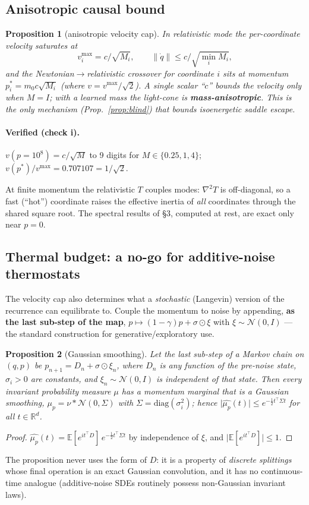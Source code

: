 \documentclass[11pt]{article}
\theoremstyle{plain}
\newtheorem{proposition}{Proposition}
\theoremstyle{definition}
\begin{document}
\subsection{Anisotropic causal bound}
\begin{proposition}[anisotropic velocity cap]\label{prop:cap}
In relativistic mode the per-coordinate velocity saturates at
\[ v_i^{\max}=c/\sqrt{M_i},\qquad \lVert\dot q\rVert\le c/\sqrt{\min_iM_i}, \]
and the Newtonian$\to$relativistic crossover for coordinate $i$ sits at momentum $p_i^*=m_0c\sqrt{M_i}$ (where $v=v^{\max}/\sqrt2$). A single scalar ``$c$'' bounds the velocity only when $M=I$; with a learned mass the light-cone is \textbf{mass-anisotropic}. This is the only mechanism (Prop.~\ref{prop:blind}) that bounds isoenergetic saddle escape.
\end{proposition}
\paragraph{Verified (check i).} $v(p=10^8)=c/\sqrt M$ to 9 digits for $M\in\{0.25,1,4\}$; $v(p^*)/v^{\max}=0.707107=1/\sqrt2$.

At finite momentum the relativistic $T$ couples modes: $\nabla^2T$ is off-diagonal, so a fast (``hot'') coordinate raises the effective inertia of \emph{all} coordinates through the shared square root. The spectral results of \S3, computed at rest, are exact only near $p=0$.

\subsection{Thermal budget: a no-go for additive-noise thermostats}\label{sec:thermal}
The velocity cap also determines what a \emph{stochastic} (Langevin) version of the recurrence can equilibrate to. Couple the momentum to noise by appending, \textbf{as the last sub-step of the map}, $p\mapsto(1-\gamma)p+\sigma\odot\xi$ with $\xi\sim\mathcal N(0,I)$ --- the standard construction for generative/exploratory use.

\begin{proposition}[Gaussian smoothing]\label{prop:gsmooth}
Let the last sub-step of a Markov chain on $(q,p)$ be $p_{n+1}=D_n+\sigma\odot\xi_n$, where $D_n$ is \emph{any} function of the pre-noise state, $\sigma_i>0$ are constants, and $\xi_n\sim\mathcal N(0,I)$ is independent of that state. Then every invariant probability measure $\mu$ has a momentum marginal that is a Gaussian smoothing, $\mu_p=\nu*\mathcal N(0,\Sigma)$ with $\Sigma=\mathrm{diag}(\sigma_i^2)$; hence $\lvert\widehat{\mu_p}(t)\rvert\le e^{-\frac12t^\top\Sigma t}$ for all $t\in\mathbb R^d$.
\end{proposition}
\begin{proof}
$\widehat{\mu_p}(t)=\mathbb E[e^{it^\top D}]\,e^{-\frac12t^\top\Sigma t}$ by independence of $\xi$, and $\lvert\mathbb E[e^{it^\top D}]\rvert\le1$.
\end{proof}
The proposition never uses the form of $D$: it is a property of \emph{discrete splittings} whose final operation is an exact Gaussian convolution, and it has no continuous-time analogue (additive-noise SDEs routinely possess non-Gaussian invariant laws).
\end{document}
